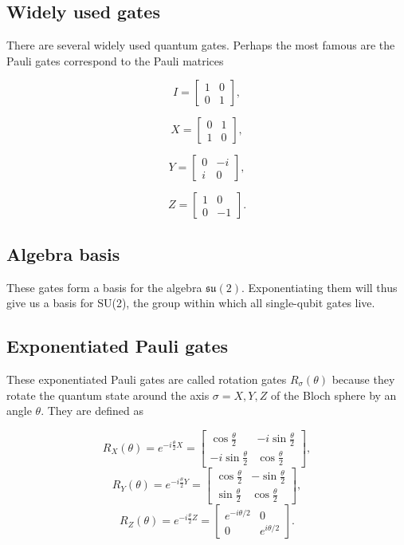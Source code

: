 \documentclass[%
oneside,                 %
final,                   %
10pt]{article}
\begin{document}
\subsection{Widely used gates}

There are several widely used quantum gates. Perhaps the most famous are 
the Pauli gates correspond to the Pauli matrices

\[
I=\begin{bmatrix} 1 & 0 \\ 0 & 1 \end{bmatrix},
\]

\[
X =\begin{bmatrix} 0 & 1 \\ 1 & 0\end{bmatrix},
\]

\[
Y=\begin{bmatrix}0 & -i \\i & 0\end{bmatrix},
\]

\[
Z=\begin{bmatrix} 1 & 0 \\ 0 & -1\end{bmatrix}.
\]

\subsection{Algebra basis}

These gates form a basis for
the algebra $\mathfrak{su}(2)$. Exponentiating them will thus give us
a basis for SU(2), the group within which all single-qubit gates
live.

\subsection{Exponentiated Pauli gates}

These exponentiated Pauli gates are called rotation gates
$R_{\sigma}(\theta)$ because they rotate the quantum state around the
axis $\sigma=X,Y,Z$ of the Bloch sphere by an angle $\theta$. They are
defined as

\[
R_X(\theta)=e^{-i\frac{\theta}{2}X}=
\begin{bmatrix}
\cos\frac{\theta}{2} & -i\sin\frac{\theta}{2} \\
-i\sin\frac{\theta}{2} & \cos\frac{\theta}{2} 
\end{bmatrix},
\]
\[
R_Y(\theta)=e^{-i\frac{\theta}{2}Y}=
\begin{bmatrix}
\cos\frac{\theta}{2} & -\sin\frac{\theta}{2} \\
\sin\frac{\theta}{2} & \cos\frac{\theta}{2} 
\end{bmatrix},
\]
\[
R_Z(\theta)=e^{-i\frac{\theta}{2}Z}=\begin{bmatrix}
e^{-i\theta/2} & 0 \\
0 & e^{i\theta/2}\end{bmatrix}.
\]
\end{document}
